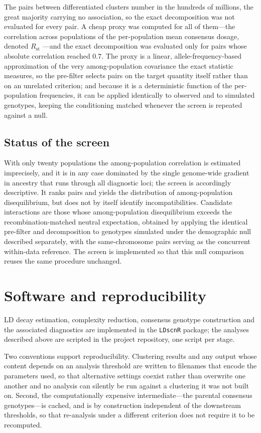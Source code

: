 \documentclass[11pt]{article}
\begin{document}
The pairs between differentiated clusters number in the hundreds of millions, the
great majority carrying no association, so the exact decomposition was not evaluated
for every pair. A cheap proxy was computed for all of them---the correlation across
populations of the per-population mean consensus dosage, denoted $R_{\mathrm{st}}$
---and the exact decomposition was evaluated only for pairs whose absolute
correlation reached $0.7$. The proxy is a linear, allele-frequency-based
approximation of the very among-population covariance the exact statistic measures,
so the pre-filter selects pairs on the target quantity itself rather than on an
unrelated criterion; and because it is a deterministic function of the
per-population frequencies, it can be applied identically to observed and to
simulated genotypes, keeping the conditioning matched whenever the screen is
repeated against a null.

\subsection{Status of the screen}
With only twenty populations the among-population correlation is estimated
imprecisely, and it is in any case dominated by the single genome-wide gradient in
ancestry that runs through all diagnostic loci; the screen is accordingly
descriptive. It ranks pairs and yields the distribution of among-population
disequilibrium, but does not by itself identify incompatibilities. Candidate
interactions are those whose among-population disequilibrium exceeds the
recombination-matched neutral expectation, obtained by applying the identical
pre-filter and decomposition to genotypes simulated under the demographic null
described separately, with the same-chromosome pairs serving as the concurrent
within-data reference. The screen is implemented so that this null comparison
reuses the same procedure unchanged.

\section{Software and reproducibility}

LD decay estimation, complexity reduction, consensus genotype construction and
the associated diagnostics are implemented in the \texttt{LDscnR} package; the
analyses described above are scripted in the project repository, one script per
stage.

Two conventions support reproducibility. Clustering results and any output whose
content depends on an analysis threshold are written to filenames that encode the
parameters used, so that alternative settings coexist rather than overwrite one
another and no analysis can silently be run against a clustering it was not built
on. Second, the computationally expensive intermediate---the parental consensus
genotypes---is cached, and is by construction independent of the downstream
thresholds, so that re-analysis under a different criterion does not require it
to be recomputed.
\end{document}
